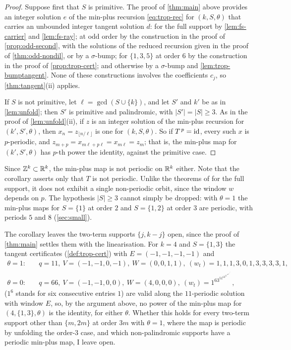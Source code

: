 \begin{proof}
Suppose first that $S$ is primitive. The proof of \autoref{thm:main} above
provides an integer solution $e$ of the min-plus recursion \eqref{eq:trop-rec}
for $(k,S,\theta)$ that carries an unbounded integer tangent solution $d$: for
the full support by \autoref{lem:fs-carrier} and \autoref{lem:fs-ray}; at
odd order by the construction in the proof of \autoref{prop:odd-second}, with
the solutions of the reduced recursion given in the proof of
\autoref{thm:odd-nondil}, or by a $\sigma$-bump; for $\{1,3,5\}$ at order $6$ by
the construction in the proof of \autoref{prop:trop-cert}; and otherwise by a
$\sigma$-bump and \autoref{lem:trop-bumptangent}. None of these constructions
involves the coefficients $c_j$, so \autoref{thm:tangent}(ii) applies.

If $S$ is not primitive, let $\ell=\gcd(S\cup\{k\})$, and let $S'$ and
$k'$ be as in \autoref{lem:unfold}; then $S'$ is primitive and palindromic,
with $|S'|=|S|\ge3$. As in the proof of \autoref{lem:unfold}(ii), if $z$ is an
integer solution of the min-plus recursion for $(k',S',\theta)$, then
$x_n=z_{\lfloor n/\ell\rfloor}$ is one for $(k,S,\theta)$. So if $T^{\,p}=\mathrm{id}$,
every such $x$ is $p$-periodic, and $z_{m+p}=x_{m\ell+p\ell}=x_{m\ell}=z_m$;
that is, the min-plus map for $(k',S',\theta)$ has $p$-th power the identity,
against the primitive case.
\end{proof}

Since $\mathbb{Z}^k\subset\mathbb{R}^k$, the min-plus map is not periodic on $\mathbb{R}^k$ either.
Note that the corollary asserts only that $T$ is not periodic. Unlike the
theorems of \citeauthor{CsornyeiLaczkovich2001} for the full support, it does
not exhibit a single non-periodic orbit, since the window $w$ depends on $p$. The
hypothesis $|S|\ge3$ cannot simply be dropped: with $\theta=1$ the min-plus
maps for $S=\{1\}$ at order $2$ and $S=\{1,2\}$ at order $3$ are periodic,
with periods $5$ and $8$ (\autoref{sec:small}).

The corollary leaves the two-term supports $\{j,k-j\}$ open, since the proof
of \autoref{thm:main} settles them with the linearisation. For $k=4$ and
$S=\{1,3\}$ the tangent certificates (\autoref{def:trop-cert}) with
$E=(-1,-1,-1,-1)$ and
\begin{align*}
\theta=1:&\quad q=11,\ V=(-1,-1,0,-1),\ W=(0,0,1,1),\
(w_t)=1,1,1,3,0,1,3,3,3,3,1,\\
\theta=0:&\quad q=66,\ V=(-1,-1,0,0),\ W=(4,0,0,0),\
(w_t)=1^63^51^63^51^63^61^53^61^53^61^53^5,
\end{align*}
($1^6$ stands for six consecutive entries $1$) are valid along the
$11$-periodic solution with window $E$, so, by the argument above, no power
of the min-plus map for $(4,\{1,3\},\theta)$ is the identity, for either
$\theta$. Whether this holds for every two-term support other than $\{m,2m\}$ at order
$3m$ with $\theta=1$, where the map is periodic by unfolding the order-$3$
case, and which
non-palindromic supports have a periodic min-plus map, I leave open.
